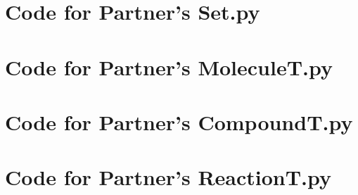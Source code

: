 \documentclass[12pt]{article}
\begin{document}
\noindent 

\newpage

\section{Code for Partner's Set.py}

\noindent 

\newpage

\section{Code for Partner's MoleculeT.py}

\noindent 

\newpage

\section{Code for Partner's CompoundT.py}

\noindent 

\newpage

\section{Code for Partner's ReactionT.py}

\noindent 
\end{document}
